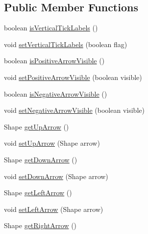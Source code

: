 \subsection*{Public Member Functions}
\begin{DoxyCompactItemize}
\item 
boolean \mbox{\hyperlink{classorg_1_1jfree_1_1chart_1_1axis_1_1_value_axis_a56e525f6ffdb6a75d1479f9d701db135}{is\+Vertical\+Tick\+Labels}} ()
\item 
void \mbox{\hyperlink{classorg_1_1jfree_1_1chart_1_1axis_1_1_value_axis_a748957d44aba12f460d90707e434f336}{set\+Vertical\+Tick\+Labels}} (boolean flag)
\item 
boolean \mbox{\hyperlink{classorg_1_1jfree_1_1chart_1_1axis_1_1_value_axis_a22d3f1b5a1ecb24e760a2eb9fc49c615}{is\+Positive\+Arrow\+Visible}} ()
\item 
void \mbox{\hyperlink{classorg_1_1jfree_1_1chart_1_1axis_1_1_value_axis_ace6e9ae3bfb65950ec5ca771f432630f}{set\+Positive\+Arrow\+Visible}} (boolean visible)
\item 
boolean \mbox{\hyperlink{classorg_1_1jfree_1_1chart_1_1axis_1_1_value_axis_acddcfabc4466e9bfb3280d40183bdaa5}{is\+Negative\+Arrow\+Visible}} ()
\item 
void \mbox{\hyperlink{classorg_1_1jfree_1_1chart_1_1axis_1_1_value_axis_a893d80e7d1feb0c3e083749a11bebc5f}{set\+Negative\+Arrow\+Visible}} (boolean visible)
\item 
Shape \mbox{\hyperlink{classorg_1_1jfree_1_1chart_1_1axis_1_1_value_axis_adfbdda5b0016c6d1f8d238979f3ab1a1}{get\+Up\+Arrow}} ()
\item 
void \mbox{\hyperlink{classorg_1_1jfree_1_1chart_1_1axis_1_1_value_axis_ab951a2ddff08bc090fc5b9ea4291aa8c}{set\+Up\+Arrow}} (Shape arrow)
\item 
Shape \mbox{\hyperlink{classorg_1_1jfree_1_1chart_1_1axis_1_1_value_axis_a202802c63b8054742b83b462f2e467c7}{get\+Down\+Arrow}} ()
\item 
void \mbox{\hyperlink{classorg_1_1jfree_1_1chart_1_1axis_1_1_value_axis_a299e89865d4a95a60518445de0807b34}{set\+Down\+Arrow}} (Shape arrow)
\item 
Shape \mbox{\hyperlink{classorg_1_1jfree_1_1chart_1_1axis_1_1_value_axis_a68bc86e19cb0a68264f057981ecb4963}{get\+Left\+Arrow}} ()
\item 
void \mbox{\hyperlink{classorg_1_1jfree_1_1chart_1_1axis_1_1_value_axis_a780dc600f43e8e1df3353ed44d77b0a8}{set\+Left\+Arrow}} (Shape arrow)
\item 
Shape \mbox{\hyperlink{classorg_1_1jfree_1_1chart_1_1axis_1_1_value_axis_a5a1a077afd417597a208df17e1e6410f}{get\+Right\+Arrow}} ()

\end{DoxyCompactItemize}
